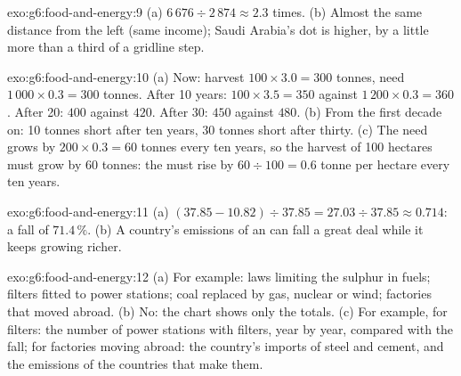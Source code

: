 \begin{solution}{exo:g6:food-and-energy:9}
(a) $6\,676 \div 2\,874 \approx 2.3$ times. (b) Almost the same distance from the
left (same income); Saudi Arabia's dot is higher, by a little more than a third of
a gridline step.
\end{solution}

\begin{solution}{exo:g6:food-and-energy:10}
(a) Now: harvest $100 \times 3.0 = 300$ tonnes, need $1\,000 \times 0.3 = 300$ tonnes.
After 10 years: $100 \times 3.5 = 350$ against $1\,200 \times 0.3 = 360$. After 20:
$400$ against $420$. After 30: $450$ against $480$. (b) From the first decade on:
10 tonnes short after ten years, 30 tonnes short after thirty. (c) The need grows by
$200 \times 0.3 = 60$ tonnes every ten years, so the harvest of 100 hectares must grow
by 60 tonnes: the  must rise by $60 \div 100 = 0.6$ tonne per hectare every ten
years.
\end{solution}

\begin{solution}{exo:g6:food-and-energy:11}
(a) $(37.85 - 10.82) \div 37.85 = 27.03 \div 37.85 \approx 0.714$: a fall of $71.4\,\%$.
(b) A country's emissions of an  can fall a great deal while it keeps
growing richer.
\end{solution}

\begin{solution}{exo:g6:food-and-energy:12}
(a) For example: laws limiting the sulphur in fuels; filters fitted to power
stations; coal replaced by gas, nuclear or wind; factories that moved abroad.
(b) No: the chart shows only the totals. (c) For example, for filters: the
number of power stations with filters, year by year, compared with the fall; for
factories moving abroad: the country's imports of steel and cement, and the
emissions of the countries that make them.
\end{solution}

